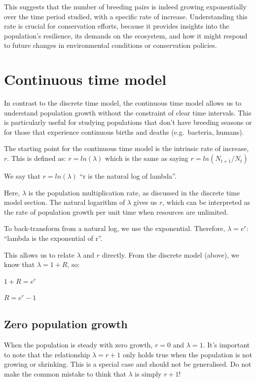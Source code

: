 \documentclass[
  a4paper]{book}
\begin{document}
This suggests that the number of breeding pairs is indeed growing exponentially over the time period studied, with a specific rate of increase. Understanding this rate is crucial for conservation efforts, because it provides insights into the population's resilience, its demands on the ecosystem, and how it might respond to future changes in environmental conditions or conservation policies.

\hypertarget{continuous-time-model}{%
\section{Continuous time model}\label{continuous-time-model}}

In contrast to the discrete time model, the continuous time model allows us to understand population growth without the constraint of clear time intervals. This is particularly useful for studying populations that don't have breeding seasons or for those that experience continuous births and deaths (e.g.~bacteria, humans).

The starting point for the continuous time model is the intrinsic rate of increase, \(r\). This is defined as: \(r = ln(\lambda)\) which is the same as saying \(r = ln(N_{t+1}/N_t)\)

We say that \(r = ln(\lambda)\) ``r is the natural log of lambda''.

Here, \(\lambda\) is the population multiplication rate, as discussed in the discrete time model section. The natural logarithm of \(\lambda\) gives us \(r\), which can be interpreted as the rate of population growth per unit time when resources are unlimited.

To back-transform from a natural log, we use the exponential. Therefore, \(\lambda = e^r\): ``lambda is the exponential of r''.

This allows us to relate \(\lambda\) and \(r\) directly. From the discrete model (above), we know that \(\lambda = 1 + R\), so:

\(1+R = e^r\)

\(R = e^r - 1\)

\hypertarget{zero-population-growth}{%
\subsection{Zero population growth}\label{zero-population-growth}}

When the population is steady with zero growth, \(r = 0\) and \(\lambda = 1\). It's important to note that the relationship \(\lambda = r + 1\) only holds true when the population is not growing or shrinking. This is a special case and should not be generalised. Do not make the common mistake to think that \(\lambda\) is simply \(r + 1\)!
\end{document}
